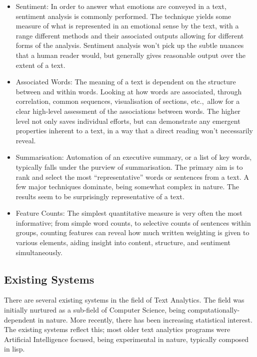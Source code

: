 \documentclass[11pt, a4paper, twoside, titlepage]{report}
\begin{document}
\begin{itemize}
\item Sentiment: In order to answer what emotions are conveyed in a
  text, sentiment analysis is commonly performed. The technique yields
  some measure of what is represented in an emotional sense by the
  text, with a range different methods and their associated outputs
  allowing for different forms of the analysis. Sentiment analysis
  won't pick up the subtle nuances that a human reader would, but
  generally gives reasonable output over the extent of a text.
\item Associated Words: The meaning of a text is dependent on the
  structure between and within words. Looking at how words are
  associated, through correlation, common sequences, visualisation of
  sections, etc.,\ allow for a clear high-level assessment of the
  associations between words. The higher level not only saves
  individual efforts, but can demonstrate any emergent properties
  inherent to a text, in a way that a direct reading won't necessarily
  reveal.
\item Summarisation: Automation of an executive summary, or a list of
  key words, typically falls under the purview of summarisation. The
  primary aim is to rank and select the most ``representative'' words
  or sentences from a text. A few major techniques dominate, being
  somewhat complex in nature. The results seem to be surprisingly
  representative of a text.
\item Feature Counts: The simplest quantitative measure is very often
  the most informative; from simple word counts, to selective counts
  of sentences within groups, counting features can reveal how much
  written weighting is given to various elements, aiding insight into
  content, structure, and sentiment simultaneously.
\end{itemize}

\subsection{Existing Systems}

There are several existing systems in the field of Text Analytics. The
field was initially nurtured as a sub-field of Computer Science, being
computationally-dependent in nature. More recently, there has been
increasing statistical interest. The existing systems reflect this;
most older text analytics programs were Artificial Intelligence
focused, being experimental in nature, typically composed in lisp.
\end{document}
